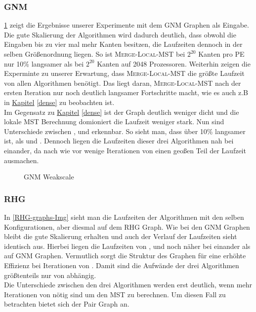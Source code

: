 \subsubsection{GNM}
\cref{GNM-graphs-Img} zeigt die Ergebnisse unserer Experimente mit dem GNM Graphen als Eingabe. \\
Die gute Skalierung der Algorithmen wird dadurch deutlich, dass obwohl die Eingaben bis zu vier mal mehr Kanten besitzen, die Laufzeiten dennoch in der selben Größenordnung liegen. So ist \textsc{Merge-Local-MST} bei $2^{20}$ Kanten pro PE nur 10\% langsamer als bei $2^{20}$ Kanten auf 2048 Prozessoren. Weiterhin zeigen die Experminte zu unserer Erwartung, dass \textsc{Merge-Local-MST} die größte Laufzeit von allen Algorithmen benötigt. Das liegt daran, \textsc{Merge-Local-MST} nach der ersten Iteration nur noch deutlich langsamer Fortschritte macht, wie es auch z.B in \hyperref[dense]{Kapitel} \ref{dense} zu beobachten ist.\\
Im Gegensatz zu \hyperref[dense]{Kapitel} \ref{dense} ist der Graph deutlich weniger dicht
und die lokale MST Berechnung domioniert die Laufzeit weniger stark.
Nun sind Unterschiede zwischen \boruvkaAllreduce, \boruvkaThenMerge und \boruvkaMixedMerge erkennbar. So sieht man, dass \boruvkaAllreduce über 10\% langsamer ist, als \boruvkaThenMerge und \boruvkaMixedMerge. Dennoch liegen die Laufzeiten dieser drei Algorithmen nah bei einander, da nach wie vor wenige Iterationen von \boruvkaAllreduce einen geoßen Teil der Laufzeit ausmachen.

\begin{figure}[H]
    \centering
    
    

    
    
    \caption{GNM Weakscale}
    \label{GNM-graphs-Img}
\end{figure}


\subsubsection{RHG}
In \cref{RHG-graphs-Img} sieht man die Laufzeiten der Algorithmen mit den selben Konfigurationen, aber diesmal auf dem RHG Graph. Wie bei den GNM Graphen bleibt die gute Skalierung erhalten und auch der Verlauf der Laufzeiten sieht identisch aus. Hierbei liegen die Laufzeiten von \boruvkaAllreduce, \boruvkaThenMerge und \boruvkaMixedMerge noch näher bei einander als auf GNM Graphen. Vermutlich sorgt die Struktur des Graphen für eine erhöhte Effizienz bei Iterationen von \boruvkaAllreduce. Damit sind die Aufwände der drei Algorithmen größtenteils nur von \boruvkaAllreduce abhängig. \\
Die Unterschiede zwischen den drei Algorithmen werden erst deutlich, wenn mehr Iterationen von \boruvkaAllreduce nötig sind um den MST zu berechnen. Um diesen Fall zu betrachten bietet sich der Pair Graph an.



